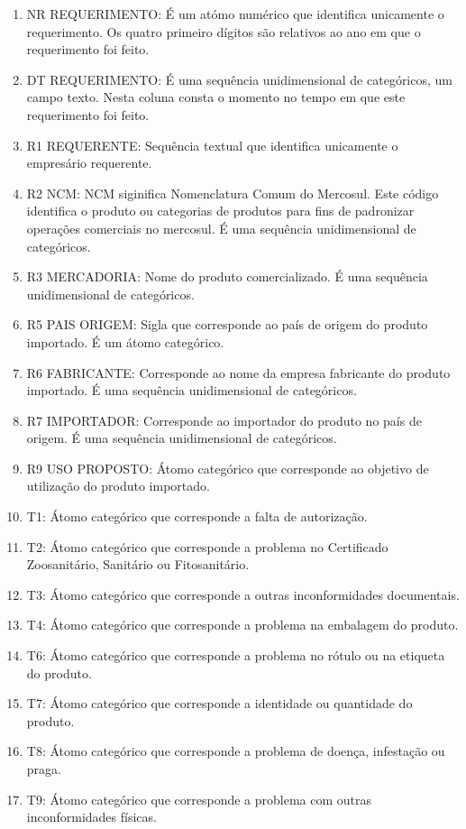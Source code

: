 \begin{enumerate}
\item NR REQUERIMENTO: É um atómo numérico que identifica unicamente o requerimento. Os quatro primeiro dígitos são relativos ao ano em que o requerimento foi feito.
\item DT REQUERIMENTO: É uma sequência unidimensional de categóricos, um campo texto. Nesta coluna consta o momento no tempo em que este requerimento foi feito.
\item  R1 REQUERENTE: Sequência textual que identifica unicamente o empresário requerente.
\item  R2 NCM: NCM siginifica Nomenclatura Comum do Mercosul. Este código identifica o produto ou categorias de produtos para fins de padronizar operações comerciais no mercosul. É uma sequência unidimensional de categóricos.
\item R3 MERCADORIA: Nome do produto comercializado. É uma sequência unidimensional de categóricos.
\item  R5 PAIS ORIGEM: Sigla que corresponde ao país de origem do produto importado. É um átomo categórico.
\item R6 FABRICANTE: Corresponde ao nome da empresa fabricante do produto importado. É uma sequência unidimensional de categóricos.
\item R7 IMPORTADOR: Corresponde ao importador do produto no país de origem. É uma sequência unidimensional de categóricos.
\item R9 USO PROPOSTO: Átomo categórico que corresponde ao objetivo de utilização do produto importado.
\item T1: Átomo categórico que corresponde a falta de autorização.
\item T2: Átomo categórico que corresponde a problema no Certificado Zoosanitário, Sanitário ou Fitosanitário.
\item T3: Átomo categórico que corresponde a outras inconformidades documentais.
\item T4: Átomo categórico que corresponde a problema na embalagem do produto.
\item T6: Átomo categórico que corresponde a problema no rótulo ou na etiqueta do produto.
\item T7: Átomo categórico que corresponde a identidade ou quantidade do produto.
\item T8: Átomo categórico que corresponde a problema de doença, infestação ou praga.
\item T9: Átomo categórico que corresponde a problema com outras inconformidades físicas.
\end{enumerate}

